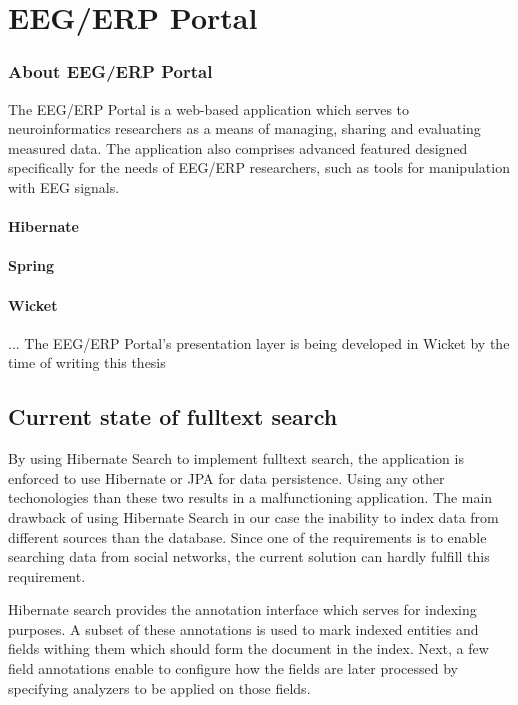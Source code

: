 \chapter{EEG/ERP Portal}


\subsection{About EEG/ERP Portal}

The EEG/ERP Portal is a web-based application which serves to neuroinformatics researchers as a means of managing, sharing and evaluating measured data. The application also comprises advanced featured designed specifically for the needs of EEG/ERP researchers, such as tools for manipulation with EEG signals.

\subsubsection*{Hibernate}


\subsubsection*{Spring}

\subsubsection*{Wicket}
... The EEG/ERP Portal's presentation layer is being developed in Wicket by the time of writing this thesis 




\section{Current state of fulltext search}

By using Hibernate Search to implement fulltext search, the application
is enforced to use Hibernate or JPA for data persistence. Using any other
techonologies than these two results in a malfunctioning application.
The main drawback of using Hibernate Search in our case the inability to index
data from different sources than the database. Since one of the requirements
is to enable searching data from social networks, the current solution
can hardly fulfill this requirement. 

Hibernate search provides the annotation interface which serves for
indexing purposes. A subset of these annotations is used to mark indexed
entities and fields withing them which should form the document in
the index. Next, a few field annotations enable to configure how the
fields are later processed by specifying analyzers to be applied on
those fields.

